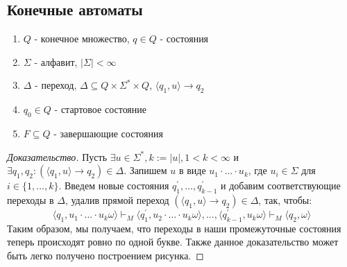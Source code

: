 \documentclass[11pt,a4paper]{article}
\theoremstyle{definition}
\theoremstyle{definition}
\theoremstyle{definition}
\begin{document}
\subsection{Конечные автоматы}
\begin{enumerate}
\item{$Q$ - конечное множество, $q \in Q$ - состояния}
\item{$\Sigma$ - алфавит, $|\Sigma| < \infty$}
\item{$\Delta$ - переход, $\Delta\subseteq Q\times\Sigma^*\times Q$, $\langle q_1, u\rangle\rightarrow q_2$}
\item{$q_0\in Q$ - стартовое состояние}
\item{$F\subseteq Q$ - завершающие состояния}
\end{enumerate}
\begin{proof}[Доказательство]
Пусть $\exists u \in \Sigma^*, k:= |u|, 1 < k < \infty$ и $\exists q_1, q_2: (\langle q_1, u \rangle\rightarrow q_2)\in \Delta$. Запишем $u$ в виде $u_1\cdot\ldots\cdot u_k$, где $u_i \in \Sigma$ для $i\in\{1, \ldots, k\}$. Введем новые состояния 
$q_1^\prime, \ldots, q_{k-1}^\prime$ и добавим соответствующие переходы в $\Delta$, удалив прямой переход $(\langle q_1, u \rangle\rightarrow q_2)\in \Delta$, так, чтобы:
\[ \langle q_1, u_1\cdot\ldots\cdot u_k\omega \rangle\vdash_M \langle q_1^\prime, u_2\cdot\ldots\cdot u_k\omega\rangle, \ldots,
\langle q_{k-1}^\prime, u_k\omega \rangle\vdash_M \langle q_2, \omega\rangle\]
Таким образом, мы получаем, что переходы в наши промежуточные состояния теперь происходят ровно по одной букве. Также данное доказательство может быть легко получено построением рисунка.
\end{proof}
\end{document}
